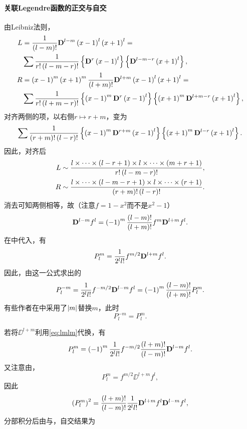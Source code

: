 \documentclass[UTF-8]{ctexart}
\begin{document}
  \paragraph{关联Legendre函数的正交与自交}
  由Leibniz法则，
  \begin{align*}
  L &= \frac{1}{\left(l-m\right)!}\mathbf{D}^{l-m}\left(x-1\right)^l\left(x+1\right)^l =\\ &\sum \frac{1}{r!\left(l-m-r\right)!} \left\{\mathbf{D}^r \left(x-1\right)^l\right\} \left\{\mathbf{D}^{l-m-r}\left(x+1\right)^l\right\},\\
  R &=\left(x-1\right)^m\left(x+1\right)^m\frac{1}{\left(l+m\right)!}\mathbf{D}^{l+m}\left(x-1\right)^l\left(x+1\right)^l =\\ &\sum \frac{1}{r!\left(l+m-r\right)!} \left\{\left(x-1\right)^m\mathbf{D}^r \left(x-1\right)^l\right\} \left\{\left(x+1\right)^m\mathbf{D}^{l+m-r}\left(x+1\right)^l\right\},
  \end{align*}
  对齐两侧的项，以右侧$r \mapsto r+m$，变为
  \[ \sum \frac{1}{\left(r+m\right)!\left(l-r\right)!} \left\{\left(x-1\right)^m\mathbf{D}^{r+m} \left(x-1\right)^l\right\} \left\{\left(x+1\right)^m\mathbf{D}^{l-r}\left(x+1\right)^l\right\}. \]
  因此，对齐后
  \begin{align*}
    L &\sim \frac{l\times \cdots \times \left(l-r+1\right)\times l \times \cdots \times \left(m+r+1\right)}{r!\left(l-m-r\right)!},\\
    R &\sim \frac{l\times \cdots \times \left(l-m-r+1\right)\times l \times \cdots \times \left(r+1\right)}{\left(r+m\right)!\left(l-r\right)!}.
  \end{align*}
  消去可知两侧相等，故（注意$f=1-x^2$而不是$x^2-1$）
  \begin{equation}
  \label{eq:lmlm} \mathbf{D}^{l-m}f^l = \left(-1\right)^m\frac{\left(l-m\right)!}{\left(l+m\right)!}f^m\mathbf{D}^{l+m}f^l.
  \end{equation}
  在中代入，有
  \[ P_l^m = \frac{1}{2^ll!}f^{m/2}\mathbf{D}^{l+m}f^l. \]
  因此，由这一公式求出的
  \[ P_l^{-m} = \frac{1}{2^ll!}f^{-m/2}\mathbf{D}^{l-m}f^l = \left(-1\right)^m \frac{\left(l-m\right)!}{\left(l+m\right)!} P_l^m. \]
  有些作者在中采用了$\abs{m}$替换$m$，此时
  \[ P_l^{-m} = P_l^{m}. \]
  \par
  若将$\DD^{l+m}$利用\ref{eq:lmlm}代换，有
  \[ P_l^m = \left(-1\right)^m\frac{1}{2^ll!}f^{-m/2}\frac{\left(l+m\right)!}{\left(l-m\right)!}\mathbf{D}^{l-m}f^l. \]
  又注意由，
  \[ P_l^m = f^{m/2}\DD^{l+m}f^l, \]
  因此
  \[ \left(P_l^m\right)^2 = \frac{\left(l+m\right)!}{\left(l-m\right)!} \frac{1}{2^ll!} \mathbf{D}^{l+m}f^l \mathbf{D}^{l-m}f^l,  \]
  分部积分后由与，自交结果为
\end{document}
